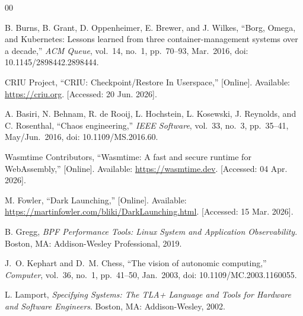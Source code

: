 \documentclass[conference]{IEEEtran}
\begin{document}
\begin{thebibliography}{00}

B. Burns, B. Grant, D. Oppenheimer, E. Brewer, and J. Wilkes, ``Borg, Omega, and Kubernetes: Lessons learned from three container-management systems over a decade,'' \textit{ACM Queue}, vol.~14, no.~1, pp.~70--93, Mar.\ 2016, doi: 10.1145/2898442.2898444.

CRIU Project, ``CRIU: Checkpoint/Restore In Userspace,'' [Online]. Available: \url{https://criu.org}. [Accessed: 20 Jun. 2026].

A. Basiri, N. Behnam, R. de Rooij, L. Hochstein, L. Kosewski, J. Reynolds, and C. Rosenthal, ``Chaos engineering,'' \textit{IEEE Software}, vol.~33, no.~3, pp.~35--41, May/Jun.\ 2016, doi: 10.1109/MS.2016.60.

Wasmtime Contributors, ``Wasmtime: A fast and secure runtime for WebAssembly,'' [Online]. Available: \url{https://wasmtime.dev}. [Accessed: 04 Apr. 2026].

M. Fowler, ``Dark Launching,'' [Online]. Available: \url{https://martinfowler.com/bliki/DarkLaunching.html}. [Accessed: 15 Mar. 2026].

B. Gregg, \textit{BPF Performance Tools: Linux System and Application Observability}. Boston, MA: Addison-Wesley Professional, 2019.

J.~O. Kephart and D.~M. Chess, ``The vision of autonomic computing,'' \textit{Computer}, vol.~36, no.~1, pp.~41--50, Jan.\ 2003, doi: 10.1109/MC.2003.1160055.

L. Lamport, \textit{Specifying Systems: The TLA+ Language and Tools for Hardware and Software Engineers}. Boston, MA: Addison-Wesley, 2002.

\end{thebibliography}
\end{document}
